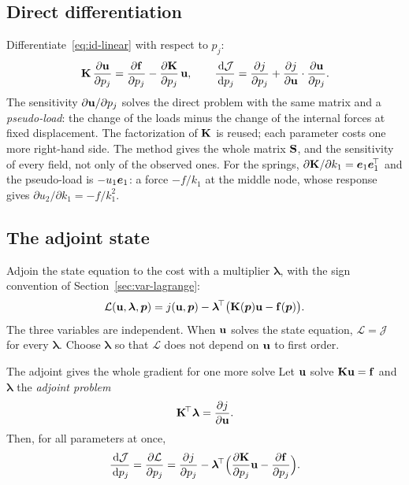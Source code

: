 \subsection{Direct differentiation}\label{ssec:id-ddm}
%
Differentiate~\eqref{eq:id-linear} with respect to $p_j$:
\begin{equation}\label{eq:id-ddm-lin}
  \mathbf{K}\,\frac{\partial\mathbf{u}}{\partial p_j}
  =\frac{\partial\mathbf{f}}{\partial p_j}-\frac{\partial\mathbf{K}}{\partial p_j}\,\mathbf{u},
  \qquad
  \frac{\,\mathrm{d}\mathcal J}{\,\mathrm{d} p_j}=\frac{\partial j}{\partial p_j}
  +\frac{\partial j}{\partial\mathbf{u}}\cdot\frac{\partial\mathbf{u}}{\partial p_j}.
\end{equation}
The sensitivity $\partial\mathbf{u}/\partial p_j$ solves the direct problem with the
same matrix and a \emph{pseudo-load}: the change of the loads minus the change
of the internal forces at fixed displacement. The factorization of $\mathbf{K}$ is
reused; each parameter costs one more right-hand side. The method gives the
whole matrix $\mathbf{S}$, and the sensitivity of every field, not only of the
observed ones. For the springs, $\partial\mathbf{K}/\partial k_1=\bm{e}_1\bm{e}_1^{\!\top}$ and the
pseudo-load is $-u_1\bm{e}_1$: a force $-f/k_1$ at the middle node, whose response
gives $\partial u_2/\partial k_1=-f/k_1^2$.

\subsection{The adjoint state}\label{ssec:id-adj}
%
Adjoin the state equation to the cost with a multiplier $\boldsymbol\lambda$,
with the sign convention of Section~\ref{sec:var-lagrange}:
\begin{equation}\label{eq:id-lag-lin}
  \mathcal L(\mathbf{u},\boldsymbol\lambda,\bm{p})=j(\mathbf{u},\bm{p})-\boldsymbol\lambda^{\!\top}\bigl(\mathbf{K}(\bm{p})\mathbf{u}-\mathbf{f}(\bm{p})\bigr).
\end{equation}
The three variables are independent. When $\mathbf{u}$ solves the state equation,
$\mathcal L=\mathcal J$ for every $\boldsymbol\lambda$. Choose $\boldsymbol\lambda$ so that
$\mathcal L$ does not depend on $\mathbf{u}$ to first order.
\begin{gbox}{The adjoint gives the whole gradient for one more solve}\label{prop:id-adj}
Let $\mathbf{u}$ solve $\mathbf{K}\mathbf{u}=\mathbf{f}$ and $\boldsymbol\lambda$ the \emph{adjoint problem}
\begin{equation}\label{eq:id-adj-lin}
  \mathbf{K}^{\!\top}\boldsymbol\lambda=\frac{\partial j}{\partial\mathbf{u}} .
\end{equation}
Then, for all parameters at once,
\begin{equation}\label{eq:id-grad-lin}
  \frac{\,\mathrm{d}\mathcal J}{\,\mathrm{d} p_j}=\frac{\partial\mathcal L}{\partial p_j}
  =\frac{\partial j}{\partial p_j}
  -\boldsymbol\lambda^{\!\top}\Bigl(\frac{\partial\mathbf{K}}{\partial p_j}\mathbf{u}-\frac{\partial\mathbf{f}}{\partial p_j}\Bigr).
\end{equation}
\end{gbox}
